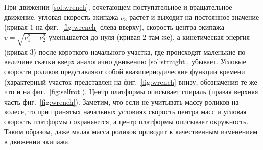 При движении \ref{sol:wrench}, сочетающем поступательное и вращательное движение, угловая скорость экипажа $\nu_3$ растет и выходит на постоянное значение (кривая $\textit{1}$ на фиг.~\ref{fig:wrench} слева вверху), скорость центра экипажа $v = \sqrt{\nu_1^2+\nu_2^2}$ уменьшается до нуля (кривая $\textit{2}$ там же), а кинетическая энергия (кривая $\textit{3}$) после короткого начального участка, где происходят маленькие по величине скачки вверх аналогично движению \ref{sol:straight}, убывает. Угловые скорости роликов представляют собой квазипериодические функции времени (характерный участок представлен на фиг.~\ref{fig:wrench} внизу, обозначения те же что и на фиг.~\ref{fig:selfrot}). Центр платформы описывает спираль (правая верхняя часть фиг.~\ref{fig:wrench}). Заметим, что если не учитывать массу роликов на колесе, то при принятых начальных условиях скорость центра масс и угловая скорость платформы сохраняются, а центр платформы описывает окружность. Таким образом, даже малая масса роликов приводит к качественным изменениям в движении экипажа.


